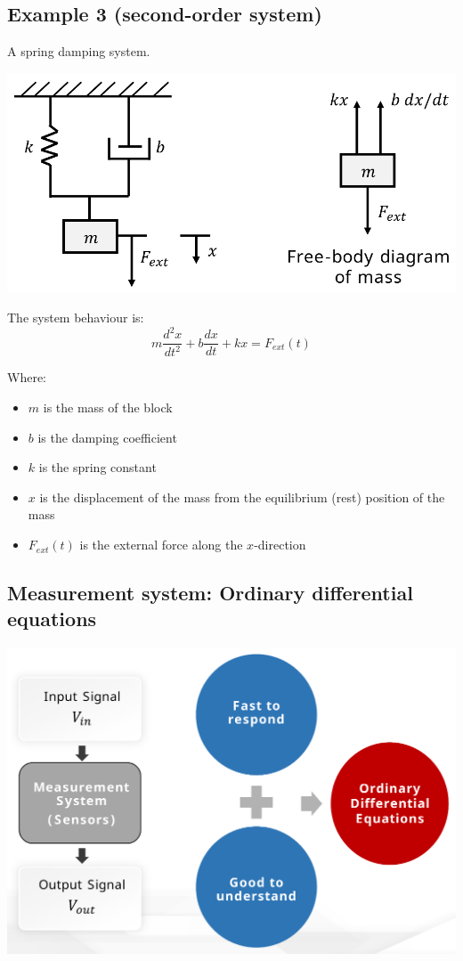 \documentclass[11pt]{article}
\begin{document}
 \newpage
\subsection{Example 3 (second-order system)}
\label{sec:orgee7c7e4}
A spring damping system.
\begin{center}
\includegraphics[width=.9\linewidth]{./images/spring-damping-system.png}
\end{center}

The system behaviour is:
\[m \frac{d^2 x}{dt^2} + b \frac{dx}{dt} + kx = F_{ext} (t)\]

Where:
\begin{itemize}
\item \(m\) is the mass of the block
\item \(b\) is the damping coefficient
\item \(k\) is the spring constant
\item \(x\) is the displacement of the mass from the equilibrium (rest) position of the mass
\item \(F_{ext} (t)\) is the external force along the \(x\)-direction
\end{itemize}
\subsection{Measurement system: Ordinary differential equations}
\label{sec:orge5724ad}
\begin{center}
\includegraphics[width=.9\linewidth]{./images/dynamic-systems-measurement-system.png}
\end{center}
\end{document}

